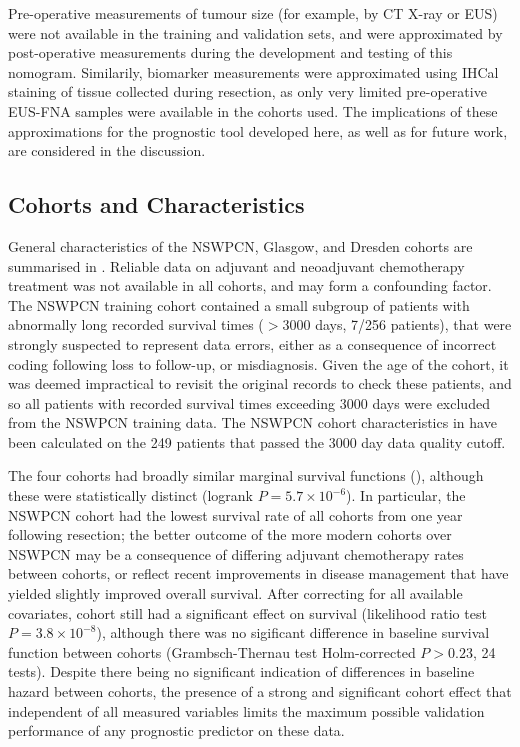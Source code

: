 \documentclass[dissertation.tex]{subfiles}
\begin{document}
Pre-operative measurements of tumour size (for example, by \gls{CT} X-ray or \gls{EUS}) were not available in the training and validation sets, and were approximated by post-operative measurements during the development and testing of this nomogram.  Similarily, biomarker measurements were approximated using \gls{IHCal} staining of tissue collected during resection, as only very limited pre-operative \gls{EUS}-\gls{FNA} samples were available in the cohorts used.  The implications of these approximations for the prognostic tool developed here, as well as for future work, are considered in the discussion.  


\subsection{Cohorts and Characteristics}
General characteristics of the \gls{NSWPCN}, Glasgow, and Dresden cohorts are summarised in .  Reliable data on adjuvant and neoadjuvant chemotherapy treatment was not available in all cohorts, and may form a confounding factor.  The \gls{NSWPCN} training cohort contained a small subgroup of patients with abnormally long recorded survival times ($> 3000$ days, 7/256 patients), that were strongly suspected to represent data errors, either as a consequence of incorrect coding following loss to follow-up, or misdiagnosis.  Given the age of the cohort, it was deemed impractical to revisit the original records to check these patients, and so all patients with recorded survival times exceeding 3000 days were excluded from the \gls{NSWPCN} training data.  The \gls{NSWPCN} cohort characteristics in  have been calculated on the 249 patients that passed the 3000 day data quality cutoff.

The four cohorts had broadly similar marginal survival functions (), although these were statistically distinct (logrank $P = 5.7 \times 10^{-6}$).  In particular, the \gls{NSWPCN} cohort had the lowest survival rate of all cohorts from one year following resection; the better outcome of the more modern cohorts over \gls{NSWPCN} may be a consequence of differing adjuvant chemotherapy rates between cohorts, or reflect recent improvements in disease management that have yielded slightly improved overall survival.  After correcting for all available covariates, cohort still had a significant effect on survival (likelihood ratio test $P = 3.8 \times 10^{-8}$), although there was no sigificant difference in baseline survival function between cohorts (Grambsch-Thernau test \cite{Grambsch1994} Holm-corrected $P > 0.23$, 24 tests).  Despite there being no significant indication of differences in baseline hazard between cohorts, the presence of a strong and significant cohort effect that independent of all measured variables limits the maximum possible validation performance of any prognostic predictor on these data.
\end{document}
